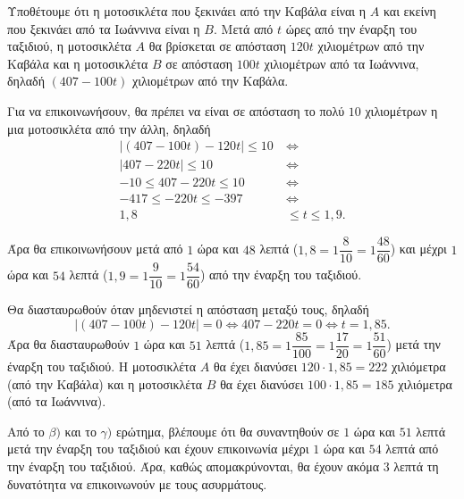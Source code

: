 
\begin{alist}
\item Υποθέτουμε ότι η μοτοσικλέτα που ξεκινάει από την Καβάλα είναι η $A$ και εκείνη που ξεκινάει από τα Ιωάννινα είναι η $B$. Μετά από $t$ ώρες από την έναρξη του ταξιδιού, η μοτοσικλέτα $A$ θα βρίσκεται σε απόσταση $120t$ χιλιομέτρων από την Καβάλα και η μοτοσικλέτα $B$ σε απόσταση $100t$ χιλιομέτρων από τα Ιωάννινα, δηλαδή $(407 - 100t)$ χιλιομέτρων από την Καβάλα.

\item Για να επικοινωνήσουν, θα πρέπει να είναι σε απόσταση το πολύ $10$ χιλιομέτρων η μια μοτοσικλέτα από την άλλη, δηλαδή
\begin{align*}
|(407 - 100t) - 120t| \le 10 \ &\Leftrightarrow \\
|407 - 220t| \le 10 \ &\Leftrightarrow \\
-10 \le 407 - 220t \le 10 \ &\Leftrightarrow \\
-417 \le -220t \le -397 \ &\Leftrightarrow \\
1,8 &\le t \le 1,9.
\end{align*}

Άρα θα επικοινωνήσουν μετά από $1$ ώρα και $48$ λεπτά ($1,8 = 1 \dfrac{8}{10} = 1 \dfrac{48}{60}$) και μέχρι $1$ ώρα και $54$ λεπτά ($1,9 = 1 \dfrac{9}{10} = 1 \dfrac{54}{60}$) από την έναρξη του ταξιδιού.

\item Θα διασταυρωθούν όταν μηδενιστεί η απόσταση μεταξύ τους, δηλαδή
\[|(407 - 100t) - 120t| = 0 \Leftrightarrow 407 - 220t = 0 \Leftrightarrow t = 1,85.\]
Άρα θα διασταυρωθούν $1$ ώρα και $51$ λεπτά ($1,85 = 1 \dfrac{85}{100} = 1 \dfrac{17}{20} = 1 \dfrac{51}{60}$) μετά την έναρξη του ταξιδιού.
Η μοτοσικλέτα $A$ θα έχει διανύσει $120 \cdot 1,85 = 222$ χιλιόμετρα (από την Καβάλα) και η μοτοσικλέτα $B$ θα έχει διανύσει $100 \cdot 1,85 = 185$ χιλιόμετρα (από τα Ιωάννινα).

\item Από το $\beta)$ και το $\gamma)$ ερώτημα, βλέπουμε ότι θα συναντηθούν σε $1$ ώρα και $51$ λεπτά μετά την έναρξη του ταξιδιού και έχουν επικοινωνία μέχρι $1$ ώρα και $54$ λεπτά από την έναρξη του ταξιδιού. Άρα, καθώς απομακρύνονται, θα έχουν ακόμα $3$ λεπτά τη δυνατότητα να επικοινωνούν με τους ασυρμάτους.
\end{alist}

